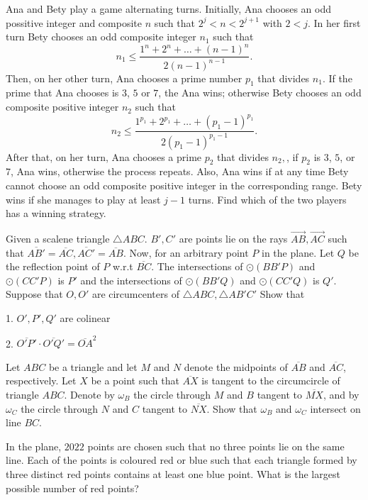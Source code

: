 \documentclass[11pt]{scrartcl}
\begin{document}
\begin{problem}[299125558562230]
	Ana and Bety play a game alternating turns. Initially, Ana chooses an odd possitive integer and composite $n$ such that $2^j<n<2^{j+1}$ with $2<j$. In her first turn Bety chooses an odd composite integer $n_1$ such that
\[n_1\leq \frac{1^n+2^n+\dots+(n-1)^n}{2(n-1)^{n-1}}.\]Then, on her other turn, Ana chooses a prime number $p_1$ that divides $n_1$. If the prime that Ana chooses is $3$, $5$ or $7$, the Ana wins; otherwise Bety chooses an odd composite positive integer $n_2$ such that\[n_2\leq \frac{1^{p_1}+2^{p_1}+\dots+(p_1-1)^{p_1}}{2(p_1-1)^{p_1-1}}.\]After that, on her turn, Ana chooses a prime $p_2$ that divides $n_2,$, if $p_2$ is $3$, $5$, or $7$, Ana wins, otherwise the process repeats. Also, Ana wins if at any time Bety cannot choose an odd composite positive integer in the corresponding range. Bety wins if she manages to play at least $j-1$ turns. Find which of the two players has a winning strategy.
\end{problem}
\begin{problem}[1810915585111530473]
	Given a scalene triangle $ \triangle ABC $. $ B', C' $ are points lie on the rays $ \overrightarrow{AB}, \overrightarrow{AC}  $ such that $ \overline{AB'} = \overline{AC}, \overline{AC'} = \overline{AB} $. Now, for an arbitrary point $ P $ in the plane. Let $ Q $ be the reflection point of $ P $ w.r.t $ \overline{BC} $. The intersections of $ \odot{\left(BB'P\right)} $ and $ \odot{\left(CC'P\right)} $ is $ P' $ and the intersections of $ \odot{\left(BB'Q\right)} $ and $ \odot{\left(CC'Q\right)} $ is $ Q' $. Suppose that $ O, O' $ are circumcenters of $ \triangle{ABC}, \triangle{AB'C'} $ Show that

1. $ O', P', Q' $ are colinear

2. $  \overline{O'P'} \cdot  \overline{O'Q'} = \overline{OA}^{2} $
\end{problem}
\begin{problem}[503121367540901]
	Let $ABC$ be a triangle and let $M$ and $N$ denote the midpoints of $\overline{AB}$ and $\overline{AC}$, respectively. Let $X$ be a point such that $\overline{AX}$ is tangent to the circumcircle of triangle $ABC$. Denote by $\omega_B$ the circle through $M$ and $B$ tangent to $\overline{MX}$, and by $\omega_C$ the circle through $N$ and $C$ tangent to $\overline{NX}$. Show that $\omega_B$ and $\omega_C$ intersect on line $BC$.
\end{problem}
\begin{problem}[119253293150446]
	In the plane, $2022$ points are chosen such that no three points lie on the same line. Each of the points is coloured red or blue such that each triangle formed by three distinct red points contains at least one blue point.
What is the largest possible number of red points?
\end{problem}
\end{document}
